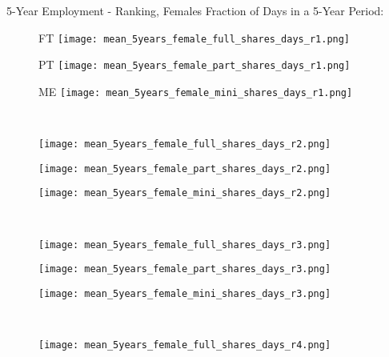 \documentclass[hyperref={bookmarks=false}]{beamer}
\begin{document}
\begin{appendix}
\begin{frame}{5-Year Employment - Ranking, Females}
Fraction of Days in a 5-Year Period:
\begin{figure}[!t]
\begin{minipage}[b]{0.15\textwidth}{FT}
\centering
\texttt{[image: mean\_5years\_female\_full\_shares\_days\_r1.png]}
\end{minipage}
\begin{minipage}[b]{0.15\textwidth}{PT}
\centering
\texttt{[image: mean\_5years\_female\_part\_shares\_days\_r1.png]}
\end{minipage}
\begin{minipage}[b]{0.15\textwidth}{ME}
\centering
\texttt{[image: mean\_5years\_female\_mini\_shares\_days\_r1.png]}
\end{minipage}\\
\begin{minipage}[b]{0.15\textwidth}{}
\centering
\texttt{[image: mean\_5years\_female\_full\_shares\_days\_r2.png]}
\end{minipage}
\begin{minipage}[b]{0.15\textwidth}{}
\centering
\texttt{[image: mean\_5years\_female\_part\_shares\_days\_r2.png]}
\end{minipage}
\begin{minipage}[b]{0.15\textwidth}{}
\centering
\texttt{[image: mean\_5years\_female\_mini\_shares\_days\_r2.png]}
\end{minipage}\\
\begin{minipage}[b]{0.15\textwidth}{}
\centering
\texttt{[image: mean\_5years\_female\_full\_shares\_days\_r3.png]}
\end{minipage}
\begin{minipage}[b]{0.15\textwidth}{}
\centering
\texttt{[image: mean\_5years\_female\_part\_shares\_days\_r3.png]}
\end{minipage}
\begin{minipage}[b]{0.15\textwidth}{}
\centering
\texttt{[image: mean\_5years\_female\_mini\_shares\_days\_r3.png]}
\end{minipage}\\
\begin{minipage}[b]{0.15\textwidth}{}
\centering
\texttt{[image: mean\_5years\_female\_full\_shares\_days\_r4.png]}
\end{minipage}
\begin{minipage}[b]{0.15\textwidth}{}

\end{minipage}
\end{figure}
\end{frame}
\end{appendix}
\end{document}
